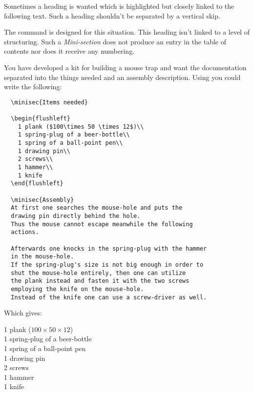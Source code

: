 \begin{Declaration}
\end{Declaration}%
%
Sometimes a heading is wanted which is highlighted but
closely linked to the following text. Such a heading shouldn't be
separated by a vertical skip.

The command  is designed for this situation. This heading
isn't linked to a level of structuring. Such a \emph{Mini-section}
does not produce an entry in the table of contents nor does it receive
any numbering.
\begin{Example}
  You have developed a kit for building a mouse trap and want the
  documentation separated into the things needed and an assembly
  description. Using  you could write the following:
\begin{lstlisting}
  \minisec{Items needed}

  \begin{flushleft}
    1 plank ($100\times 50 \times 12$)\\
    1 spring-plug of a beer-bottle\\
    1 spring of a ball-point pen\\
    1 drawing pin\\
    2 screws\\
    1 hammer\\
    1 knife
  \end{flushleft}

  \minisec{Assembly}
  At first one searches the mouse-hole and puts the 
  drawing pin directly behind the hole.
  Thus the mouse cannot escape meanwhile the following
  actions.

  Afterwards one knocks in the spring-plug with the hammer
  in the mouse-hole.
  If the spring-plug's size is not big enough in order to
  shut the mouse-hole entirely, then one can utilize
  the plank instead and fasten it with the two screws
  employing the knife on the mouse-hole.
  Instead of the knife one can use a screw-driver as well.
\end{lstlisting}
  Which gives:
  \begin{ShowOutput}[\baselineskip]\setlength{\parindent}{1em}

  \begin{flushleft}
    1 plank ($100\times 50 \times 12$)\\
    1 spring-plug of a beer-bottle\\
    1 spring of a ball-point pen\\
    1 drawing pin\\
    2 screws\\
    1 hammer\\
    1 knife
  \end{flushleft}


\end{ShowOutput}
\end{Example}
